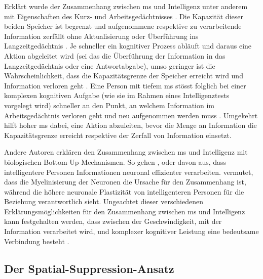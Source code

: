 \documentclass[11pt, twoside, a4paper]{book}		%
\begin{document}
Erklärt wurde der Zusammenhang zwischen \gls{ms} und Intelligenz unter anderem mit Eigenschaften des Kurz- und Arbeitsgedächtnisses \citep[z.~B.][]{Jensen1982b, Jensen2006, Vernon1983}. 
Die Kapazität dieser beiden Speicher ist begrenzt und aufgenommene respektive zu verarbeitende Information zerfällt ohne Aktualisierung oder Überführung ins Langzeitgedächtnis \citep{Baddeley2009}. Je schneller ein kognitiver Prozess abläuft und daraus eine Aktion abgeleitet wird (sei das die Überführung der Information in das Langzeitgedächtnis oder eine Antwortabgabe), umso geringer ist die Wahrscheinlichkeit, dass die Kapazitätsgrenze der Speicher erreicht wird und Information verloren geht \citep{Jensen2006}.
Eine Person mit tiefem \gls{ms} stösst folglich bei einer komplexen kognitiven Aufgabe (wie sie im Rahmen eines Intelligenztests vorgelegt wird) schneller an den Punkt, an welchem Information im Arbeitsgedächtnis verloren geht und neu aufgenommen werden muss \citep{Lehrl1988, Lehrl1990}. Umgekehrt hilft hoher \gls{ms} dabei, eine Aktion abzuleiten, bevor die Menge an Information die Kapazitätsgrenze erreicht respektive der Zerfall von Information einsetzt.

Andere Autoren erklären den Zusammenhang zwischen \gls{ms} und Intelligenz mit biologischen Bot\-tom-Up-Mech\-an\-is\-men. So gehen \citet{Bates1995}, \citet{Hendrickson1980} oder \citet{Reed1992} davon aus, dass intelligentere Personen Informationen neuronal effizienter verarbeiten. \citet{Miller1994} vermutet, dass die Myelinisierung der Neuronen die Ursache für den Zusammenhang ist, während \citet{Garlick2002} die höhere neuronale Plastizität von intelligenteren Personen für die Beziehung verantwortlich sieht. Ungeachtet dieser verschiedenen Erklärungsmöglichkeiten für den Zusammenhang zwischen \gls{ms} und Intelligenz kann festgehalten werden, dass zwischen der Geschwindigkeit, mit der Information verarbeitet wird, und komplexer kognitiver Leistung eine bedeutsame Verbindung besteht  \citep[sowohl auf manifester als auch auf latenter Ebene, siehe][]{Neubauer1996, Sheppard2008}.

\subsection{Der Spatial-Suppression-Ansatz \label{subsec:Der_Spatial-Suppression-Ansatz}}
\end{document}
